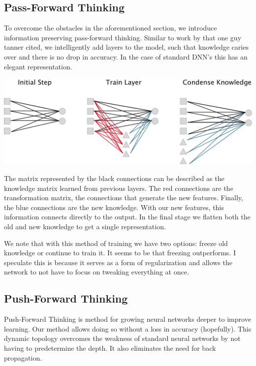 \documentclass{article}
\begin{document}
\subsection{Pass-Forward Thinking}

To overcome the obstacles in the aforementioned section, we introduce information preserving pass-forward thinking. Similar to work by that one guy tanner cited, we intelligently add layers to the model, such that knowledge caries over and there is no drop in accuracy. In the case of standard DNN's this has an elegant representation.

\begin{center}
\includegraphics[scale=.30]{flow-diagram}
\end{center}

The matrix represented by the black connections can be described as the knowledge matrix learned from previous layers. The red connections are the transformation matrix, the connections that generate the new features. Finally, the blue connections are the new knowledge. With our new features, this information connects directly to the output. In the final stage we flatten both the old and new knowledge to get a single representation.

We note that with this method of training we have two options: freeze old knowledge or continue to train it. It seems to be that freezing outperforms. I speculate this is because it serves as a form of regularization and allows the network to not have to focus on tweaking everything at once.

\subsection{Push-Forward Thinking}

Push-Forward Thinking is method for growing neural networks deeper to improve learning. Our method allows doing so without a loss in accuracy (hopefully). This dynamic topology overcomes the weakness of standard neural networks by not having to predetermine the depth. It also eliminates the need for back propagation.
\end{document}
